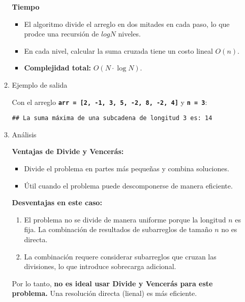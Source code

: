 \begin{enumerate}[label=\color{red}\textbf{\arabic*)}]
\begin{enumerate}[label=\arabic*)]
        \textbf{Tiempo}
        \begin{itemize}[label=\textbullet]
          \item  El algoritmo divide el arreglo en dos mitades en cada paso, lo que prodce una recursión de $log N$ niveles.
          \item En cada nivel, calcular la suma cruzada tiene un costo lineal $O(n)$.
          \item \textbf{Complejidad total:} $O(N\cdot \log N)$.
        \end{itemize}
      \item Ejemplo de salida

        Con el arreglo \textbf{\texttt{arr = [2, -1, 3, 5, -2, 8, -2, 4]}} y \textbf{\texttt{n = 3}}:
        \begin{verbatim}
## La suma máxima de una subcadena de longitud 3 es: 14
        \end{verbatim}

      \item Análisis

        \textbf{Ventajas de Divide y Vencerás:}
        \begin{itemize}[label=\textbullet]
          \item Divide el problema en partes más pequeñas y combina soluciones.
          \item Útil cuando el problema puede descomponerse de manera eficiente.
        \end{itemize}
        \textbf{Desventajas en este caso:}
        \begin{enumerate}[label=\arabic*)]
          \item El problema no se divide de manera uniforme porque la longitud $n$ es fija. La combinación de resultados de subarreglos de tamaño  $n$ no es directa.
          \item La combinación requere considerar subarreglos que cruzan las divisiones, lo que introduce sobrecarga adicional.
        \end{enumerate}
        Por lo tanto, \textbf{no es ideal usar Divide y Vencerás para este problema.} Una resolución directa (lienal) es más eficiente.
    \end{enumerate}
\end{enumerate}

